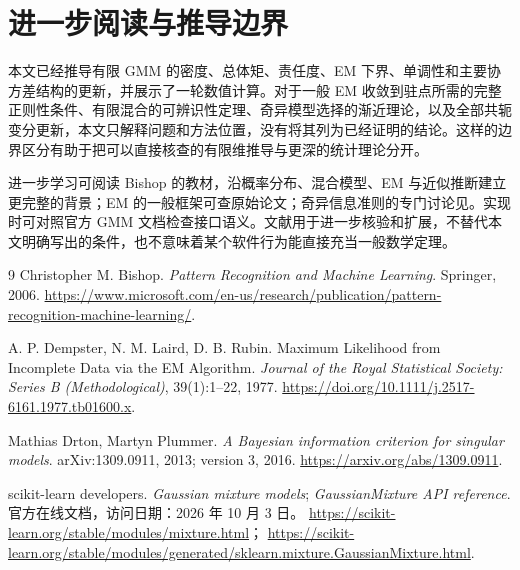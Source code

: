 \documentclass[UTF8]{ctexart}
\begin{document}
\section{进一步阅读与推导边界}
\label{sec:gmm-reading}
本文已经推导有限 GMM 的密度、总体矩、责任度、EM 下界、单调性和主要协方差结构的更新，并展示了一轮数值计算。对于一般 EM 收敛到驻点所需的完整正则性条件、有限混合的可辨识性定理、奇异模型选择的渐近理论，以及全部共轭变分更新，本文只解释问题和方法位置，没有将其列为已经证明的结论。这样的边界区分有助于把可以直接核查的有限维推导与更深的统计理论分开。

进一步学习可阅读 Bishop 的教材\cite{bishop2006}，沿概率分布、混合模型、EM 与近似推断建立更完整的背景；EM 的一般框架可查原始论文\cite{dempster1977}；奇异信息准则的专门讨论见\cite{drton2013}。实现时可对照官方 GMM 文档\cite{sklearn-gmm}检查接口语义。文献用于进一步核验和扩展，不替代本文明确写出的条件，也不意味着某个软件行为能直接充当一般数学定理。

\begin{thebibliography}{9}
Christopher M. Bishop.
\emph{Pattern Recognition and Machine Learning}.
Springer, 2006.
\url{https://www.microsoft.com/en-us/research/publication/pattern-recognition-machine-learning/}.

A. P. Dempster, N. M. Laird, D. B. Rubin.
Maximum Likelihood from Incomplete Data via the EM Algorithm.
\emph{Journal of the Royal Statistical Society: Series B (Methodological)}, 39(1):1--22, 1977.
\url{https://doi.org/10.1111/j.2517-6161.1977.tb01600.x}.

Mathias Drton, Martyn Plummer.
\emph{A Bayesian information criterion for singular models}.
arXiv:1309.0911, 2013; version 3, 2016.
\url{https://arxiv.org/abs/1309.0911}.

scikit-learn developers.
\emph{Gaussian mixture models}; \emph{GaussianMixture API reference}.
官方在线文档，访问日期：2026 年 10 月 3 日。
\url{https://scikit-learn.org/stable/modules/mixture.html}；
\url{https://scikit-learn.org/stable/modules/generated/sklearn.mixture.GaussianMixture.html}.
\end{thebibliography}
\end{document}
